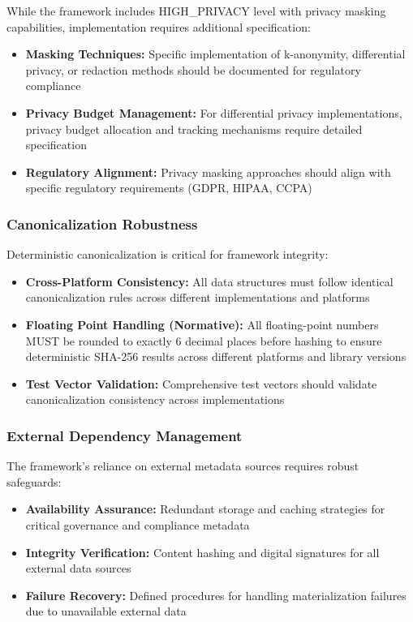 \documentclass[12pt,a4paper]{article}
\begin{document}
While the framework includes HIGH\_PRIVACY level with privacy masking capabilities, implementation requires additional specification:

\begin{itemize}
\item \textbf{Masking Techniques:} Specific implementation of k-anonymity, differential privacy, or redaction methods should be documented for regulatory compliance
\item \textbf{Privacy Budget Management:} For differential privacy implementations, privacy budget allocation and tracking mechanisms require detailed specification
\item \textbf{Regulatory Alignment:} Privacy masking approaches should align with specific regulatory requirements (GDPR, HIPAA, CCPA)
\end{itemize}

\subsubsection{Canonicalization Robustness}

Deterministic canonicalization is critical for framework integrity:

\begin{itemize}
\item \textbf{Cross-Platform Consistency:} All data structures must follow identical canonicalization rules across different implementations and platforms
\item \textbf{Floating Point Handling (Normative):} All floating-point numbers MUST be rounded to exactly 6 decimal places before hashing to ensure deterministic SHA-256 results across different platforms and library versions
\item \textbf{Test Vector Validation:} Comprehensive test vectors should validate canonicalization consistency across implementations
\end{itemize}

\subsubsection{External Dependency Management}

The framework's reliance on external metadata sources requires robust safeguards:

\begin{itemize}
\item \textbf{Availability Assurance:} Redundant storage and caching strategies for critical governance and compliance metadata
\item \textbf{Integrity Verification:} Content hashing and digital signatures for all external data sources
\item \textbf{Failure Recovery:} Defined procedures for handling materialization failures due to unavailable external data
\end{itemize}
\end{document}
